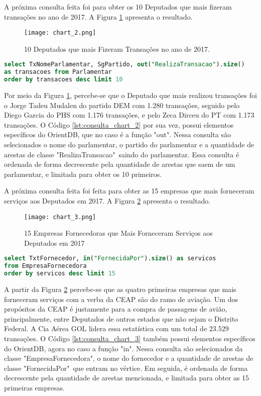 A próxima consulta feita foi para obter os 10 Deputados que mais fizeram transações no ano de 2017. A Figura \ref{fig:chart_2} apresenta o resultado.

\begin{figure}[H]
\centering
\texttt{[image: chart\_2.png]}
\caption{10 Deputados que mais Fizeram Transações no ano de 2017.}
\label{fig:chart_2}
\end{figure}

\begin{lstlisting}[label={lst:consulta_chart_2}, caption={Consulta para o gráfico \ref{fig:chart_2}},captionpos=b, language=sql]
select TxNomeParlamentar, SgPartido, out("RealizaTransacao").size() 
as transacoes from Parlamentar 
order by transacoes desc limit 10
\end{lstlisting}

Por meio da Figura \ref{fig:chart_2}, percebe-se que o Deputado que mais realizou transações foi o Jorge Tadeu Mudalen do partido DEM com 1.280 transações, seguido pelo Diego Garcia do PHS com 1.176 transações, e pelo Zeca Dirceu do PT com 1.173 transações. O Código \ref{lst:consulta_chart_2} por sua vez, possui elementos específicos do OrientDB, que no caso é a função "out". Nessa consulta são selecionados o nome do parlamentar, o partido do parlamentar e a quantidade de arestas de classe "RealizaTransacao"\ saindo do parlamentar. Essa consulta é ordenada de forma decrescente pela quantidade de arestas que saem de um parlamentar, e limitada para obter os 10 primeiros.

A próxima consulta feita foi feita para obter as 15 empresas que mais forneceram serviços aos Deputados em 2017. A Figura \ref{fig:chart_3} apresenta o resultado.

\begin{figure}[H]
\centering
\texttt{[image: chart\_3.png]}
\caption{15 Empresas Fornecedoras que Mais Forneceram Serviços aos Deputados em 2017}
\label{fig:chart_3}
\end{figure}

\begin{lstlisting}[label={lst:consulta_chart_3}, caption={Consulta para a Figura \ref{fig:chart_3}},captionpos=b, language=sql]
select TxtFornecedor, in("FornecidaPor").size() as servicos 
from EmpresaFornecedora 
order by servicos desc limit 15
\end{lstlisting}

A partir da Figura \ref{fig:chart_3} percebe-se que as quatro primeiras empresas que mais forneceram serviços com a verba da CEAP são do ramo de aviação. Um dos propósitos da CEAP é justamente para a compra de passagens de avião, principalmente, entre Deputados de outros estados que não sejam o Distrito Federal. A Cia Aérea GOL lidera essa estatística com um total de 23.529 transações. O Código \ref{lst:consulta_chart_3} também possui elementos específicos do OrientDB, agora no caso a função "in". Nessa consulta são selecionados da classe "EmpresaFornecedora", o nome do fornecedor e a quantidade de arestas de classe "FornecidaPor"\ que entram no vértice. Em seguida, é ordenada de forma decrescente pela quantidade de arestas mencionada, e limitada para obter as 15 primeiras empresas.

